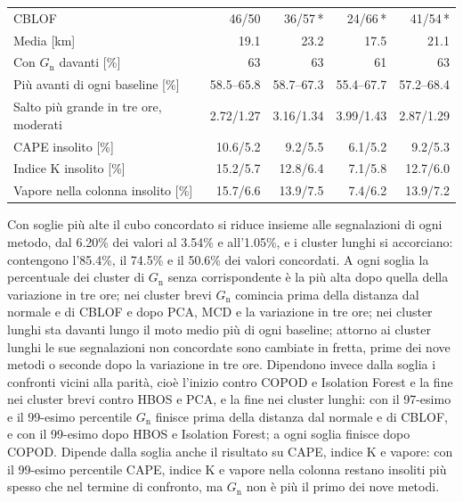\begin{table}[htbp]
\begin{tabular}{@{}L{0.36}rrrr@{}}
        CBLOF & 46/50 & 36/57\,* & 24/66\,* & 41/54\,* \\
        \addlinespace
        Media [km] & 19.1 & 23.2 & 17.5 & 21.1 \\
        Con $G_{\mathrm{n}}$ davanti [\%] & 63 & 63 & 61 & 63 \\
        Più avanti di ogni baseline [\%] & 58.5--65.8 & 58.7--67.3 & 55.4--67.7 & 57.2--68.4 \\
        \addlinespace
        Salto più grande in tre ore, moderati & 2.72/1.27 & 3.16/1.34 & 3.99/1.43 & 2.87/1.29 \\
        CAPE insolito [\%] & 10.6/5.2 & 9.2/5.5 & 6.1/5.2 & 9.2/5.3 \\
        Indice K insolito [\%] & 15.2/5.7 & 12.8/6.4 & 7.1/5.8 & 12.7/6.0 \\
        Vapore nella colonna insolito [\%] & 15.7/6.6 & 13.9/7.5 & 7.4/6.2 & 13.9/7.2 \\
        \bottomrule
    \end{tabular}
\end{table}

Con soglie più alte il cubo concordato si riduce insieme alle segnalazioni di ogni metodo, dal 6.20\% dei valori al 3.54\% e all'1.05\%, e i cluster lunghi si accorciano: contengono l'85.4\%, il 74.5\% e il 50.6\% dei valori concordati. A ogni soglia la percentuale dei cluster di $G_{\mathrm{n}}$ senza corrispondente è la più alta dopo quella della variazione in tre ore; nei cluster brevi $G_{\mathrm{n}}$ comincia prima della distanza dal normale e di CBLOF e dopo PCA, MCD e la variazione in tre ore; nei cluster lunghi sta davanti lungo il moto medio più di ogni baseline; attorno ai cluster lunghi le sue segnalazioni non concordate sono cambiate in fretta, prime dei nove metodi o seconde dopo la variazione in tre ore. Dipendono invece dalla soglia i confronti vicini alla parità, cioè l'inizio contro COPOD e Isolation Forest e la fine nei cluster brevi contro HBOS e PCA, e la fine nei cluster lunghi: con il 97-esimo e il 99-esimo percentile $G_{\mathrm{n}}$ finisce prima della distanza dal normale e di CBLOF, e con il 99-esimo dopo HBOS e Isolation Forest; a ogni soglia finisce dopo COPOD. Dipende dalla soglia anche il risultato su CAPE, indice K e vapore: con il 99-esimo percentile CAPE, indice K e vapore nella colonna restano insoliti più spesso che nel termine di confronto, ma $G_{\mathrm{n}}$ non è più il primo dei nove metodi.

